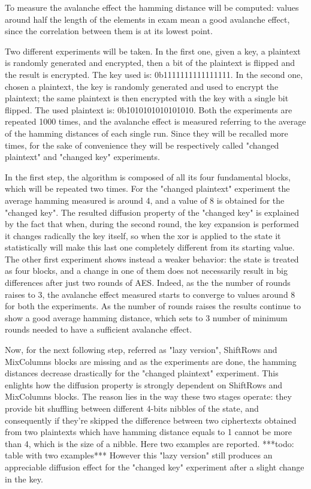 \documentclass[12pt]{article}
\begin{document}
To measure the avalanche effect the hamming distance will be computed: values around half the length of the elements in exam mean a good avalanche effect, since the correlation between them is at its lowest point.

Two different experiments will be taken.
In the first one, given a key, a plaintext is randomly generated and encrypted, then a bit of the plaintext is flipped and the result is encrypted. The key used is: {\color{blue}0b1111111111111111}.
In the second one, chosen a plaintext, the key is randomly generated and used to encrypt the plaintext; the same plaintext is then encrypted with the key with a single bit flipped. The used plaintext is: {\color{blue}0b1010101010101010}.
Both the experiments are repeated 1000 times, and the avalanche effect is measured referring to the average of the hamming distances of each single run.
Since they will be recalled more times, for the sake of convenience they will be respectively called "changed plaintext" and "changed key" experiments.

In the first step, the algorithm is composed of all its four fundamental blocks, which will be repeated two times. For the "changed plaintext" experiment the average hamming measured is around {\color{blue}4}, and a value of {\color{blue}8} is obtained for the "changed key".
The resulted diffusion property of the "changed key" is explained by the fact that when, during the second round, the key expansion is performed it changes radically the key itself, so when the xor is applied to the state it statistically will make this last one completely different from its starting value.
The other first experiment shows instead a weaker behavior: the state is treated as four blocks, and a change in one of them does not necessarily result in big differences after just two rounds of AES. Indeed, as the the number of rounds raises to 3, the avalanche effect measured starts to converge to values around {\color{blue}8} for both the experiments.
As the number of rounds raises the results continue to show a good average hamming distance, which sets to 3 number of minimum rounds needed to have a sufficient avalanche effect.

Now, for the next following step, referred as "lazy version", ShiftRows and MixColumns blocks are missing and as the experiments are done, the hamming distances decrease drastically for the "changed plaintext" experiment. This enlights how the diffusion property is strongly dependent on ShiftRows and MixColumns blocks. The reason lies in the way these two stages operate: they provide bit shuffling between different 4-bits nibbles of the state, and consequently if they're skipped the difference between two ciphertexts obtained from two plaintexts which have hamming distance equals to {\color{blue}1} cannot be more than 4, which is the size of a nibble.
Here two examples are reported.
***todo: table with two examples***
However this "lazy version" still produces an appreciable diffusion effect for the "changed key" experiment after a slight change in the key.
\end{document}
